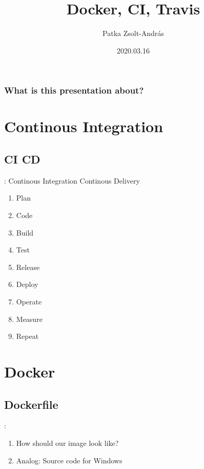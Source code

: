 \documentclass{beamer}
\title{Docker, CI, Travis}
\author{Patka Zsolt-András}
\institute{Sapientia - Computer Science BSc.}
\date{2020.03.16}
\begin{document}
\begin{frame}
    \titlepage
\end{frame}

\begin{frame}
\frametitle{What is this presentation about?}
\tableofcontents
\end{frame}

\section{Continous Integration}

\subsection{CI \/ CD}
\begin{frame}{\secname : \subsecname}
Continous Integration \/ Continous Delivery
    \begin{enumerate}
        \item Plan
        \item Code
        \item Build
        \item Test
        \item Release
        \item Deploy
        \item Operate
        \item Measure
        \item Repeat
    \end{enumerate}
\end{frame}


\section{Docker}

\subsection{Dockerfile}
\begin{frame}{\secname : \subsecname}

\begin{enumerate}
    \item How should our image look like?
    \item Analog: Source code for Windows
\end{enumerate}
\end{frame}

\end{document}
